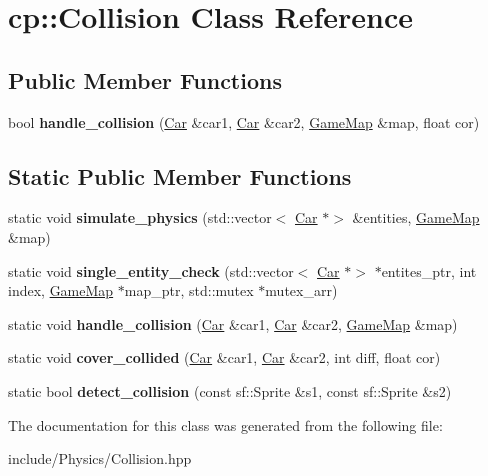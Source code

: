 \hypertarget{classcp_1_1_collision}{}\section{cp\+:\+:Collision Class Reference}
\label{classcp_1_1_collision}
\subsection*{Public Member Functions}
\begin{DoxyCompactItemize}
\item 
\mbox{\label{classcp_1_1_collision_a71a52f984bb843a3dd1aa0f486c359ea}} 
bool {\bfseries handle\+\_\+collision} (\hyperlink{classcp_1_1_car}{Car} \&car1, \hyperlink{classcp_1_1_car}{Car} \&car2, \hyperlink{classcp_1_1_game_map}{Game\+Map} \&map, float cor)
\end{DoxyCompactItemize}
\subsection*{Static Public Member Functions}
\begin{DoxyCompactItemize}
\item 
\mbox{\label{classcp_1_1_collision_a045cd52fd5e25e035426ffea327f8ccb}} 
static void {\bfseries simulate\+\_\+physics} (std\+::vector$<$ \hyperlink{classcp_1_1_car}{Car} $\ast$$>$ \&entities, \hyperlink{classcp_1_1_game_map}{Game\+Map} \&map)
\item 
\mbox{\label{classcp_1_1_collision_a4a5156d0b8bece699830bb72920af45b}} 
static void {\bfseries single\+\_\+entity\+\_\+check} (std\+::vector$<$ \hyperlink{classcp_1_1_car}{Car} $\ast$$>$ $\ast$entites\+\_\+ptr, int index, \hyperlink{classcp_1_1_game_map}{Game\+Map} $\ast$map\+\_\+ptr, std\+::mutex $\ast$mutex\+\_\+arr)
\item 
\mbox{\label{classcp_1_1_collision_a8e1ec98476f6edd03df2eb27154c37ed}} 
static void {\bfseries handle\+\_\+collision} (\hyperlink{classcp_1_1_car}{Car} \&car1, \hyperlink{classcp_1_1_car}{Car} \&car2, \hyperlink{classcp_1_1_game_map}{Game\+Map} \&map)
\item 
\mbox{\label{classcp_1_1_collision_a112e3aef8a60a0de8ca616f626023356}} 
static void {\bfseries cover\+\_\+collided} (\hyperlink{classcp_1_1_car}{Car} \&car1, \hyperlink{classcp_1_1_car}{Car} \&car2, int diff, float cor)
\item 
\mbox{\label{classcp_1_1_collision_a54f01c33786e0cf45fc7e58ac12c5e73}} 
static bool {\bfseries detect\+\_\+collision} (const sf\+::\+Sprite \&s1, const sf\+::\+Sprite \&s2)
\end{DoxyCompactItemize}


The documentation for this class was generated from the following file\+:\begin{DoxyCompactItemize}
\item 
include/\+Physics/Collision.\+hpp\end{DoxyCompactItemize}
